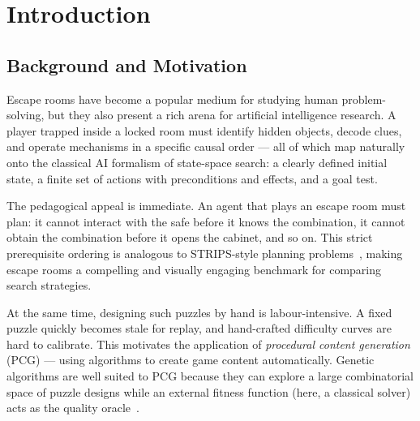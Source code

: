 \documentclass[12pt, a4paper]{report}
\begin{document}
\newpage

\tableofcontents
\newpage
\listoffigures
\newpage
\listoftables
\newpage
\lstlistoflistings
\newpage

\setcounter{page}{1}
\onehalfspacing

\chapter{Introduction}
\label{chap:intro}

\section{Background and Motivation}

Escape rooms have become a popular medium for studying human problem-solving,
but they also present a rich arena for artificial intelligence research.  A
player trapped inside a locked room must identify hidden objects, decode clues,
and operate mechanisms in a specific causal order --- all of which map naturally
onto the classical AI formalism of state-space search: a clearly defined
initial state, a finite set of actions with preconditions and effects, and a
goal test.

The pedagogical appeal is immediate.  An agent that plays an escape room must
plan: it cannot interact with the safe before it knows the combination, it
cannot obtain the combination before it opens the cabinet, and so on.  This
strict prerequisite ordering is analogous to STRIPS-style planning
problems~\cite{russell2020ai}, making escape rooms a compelling and visually
engaging benchmark for comparing search strategies.

At the same time, designing such puzzles by hand is labour-intensive.  A fixed
puzzle quickly becomes stale for replay, and hand-crafted difficulty curves are
hard to calibrate.  This motivates the application of \emph{procedural content
generation} (PCG) --- using algorithms to create game content automatically.
Genetic algorithms are well suited to PCG because they can explore a large
combinatorial space of puzzle designs while an external fitness function (here,
a classical solver) acts as the quality oracle~\cite{shaker2016procedural}.
\end{document}
